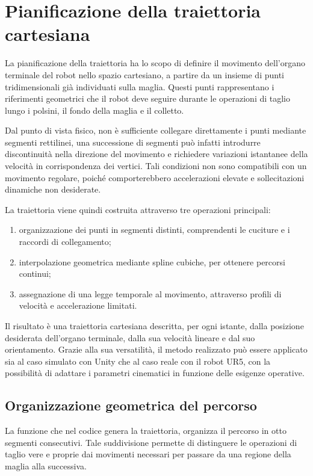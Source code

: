 \chapter{Pianificazione della traiettoria cartesiana}
\label{chap:pianificazione_traiettoria}

La pianificazione della traiettoria ha lo scopo di definire il movimento dell'organo terminale del robot nello spazio cartesiano, a partire da un insieme di punti tridimensionali già individuati sulla maglia. Questi punti rappresentano i riferimenti geometrici che il robot deve seguire durante le operazioni di taglio lungo i polsini, il fondo della maglia e il colletto.

Dal punto di vista fisico, non è sufficiente collegare direttamente i punti mediante segmenti rettilinei, una successione di segmenti può infatti introdurre discontinuità nella direzione del movimento e richiedere variazioni istantanee della velocità in corrispondenza dei vertici. Tali condizioni non sono compatibili con un movimento regolare, poiché comporterebbero accelerazioni elevate e sollecitazioni dinamiche non desiderate.

La traiettoria viene quindi costruita attraverso tre operazioni principali:
\begin{enumerate}
    \item organizzazione dei punti in segmenti distinti, comprendenti le cuciture e i raccordi di collegamento;
    \item interpolazione geometrica mediante spline cubiche, per ottenere percorsi continui;
    \item assegnazione di una legge temporale al movimento, attraverso profili di velocità e accelerazione limitati.
\end{enumerate}

Il risultato è una traiettoria cartesiana descritta, per ogni istante, dalla posizione desiderata dell'organo terminale, dalla sua velocità lineare e dal suo orientamento.
Grazie alla sua versatilità, il metodo realizzato può essere applicato sia al caso simulato con Unity che al caso reale con il robot UR5, con la possibilità di adattare i parametri cinematici in funzione delle esigenze operative.

\section{Organizzazione geometrica del percorso}

La funzione che nel codice genera la traiettoria, organizza il percorso in otto segmenti consecutivi. Tale suddivisione permette di distinguere le operazioni di taglio vere e proprie dai movimenti necessari per passare da una regione della maglia alla successiva.

